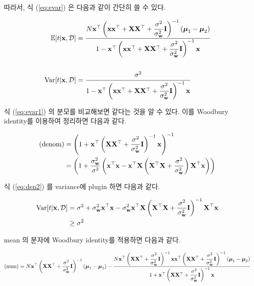 \documentclass{article} %
\begin{document}
따라서, 식 (\ref{eq:evar}) 은 다음과 같이 간단히 쓸 수 있다.

\begin{equation}
\begin{aligned}
	\mathbb{E}[t | {\bf x}, {\cal D}] &= \cfrac{N {\bf x}^\top \left( {\bf x}{\bf x}^\top + {\bf X}{\bf X}^\top + \dfrac{\sigma^2}{\sigma^2_{\bf w}} {\bf I}\right)^{-1}(\boldsymbol{\mu}_1 - \boldsymbol{\mu}_2)}{1 - {\bf x}^\top \left( {\bf x}{\bf x}^\top + {\bf X}{\bf X}^\top + \dfrac{\sigma^2}{\sigma^2_{\bf w}} {\bf I}  \right)^{-1} {\bf x}}
	\\\\
	{\rm Var}[t | {\bf x}, {\cal D}] &= \cfrac{\sigma^2}{1 - {\bf x}^\top \left( {\bf x}{\bf x}^\top + {\bf X}{\bf X}^\top + \dfrac{\sigma^2}{\sigma^2_{\bf w}} {\bf I}  \right)^{-1} {\bf x}}
\end{aligned}
\label{eq:evar1}
\end{equation}

식 (\ref{eq:evar1}) 의 분모를 비교해보면 같다는 것을 알 수 있다. 이를 Woodbury identity를 이용하여 정리하면 다음과 같다.


\begin{align}
	({\rm denom}) &= \left(
		1 + {\bf x}^\top \left( 
			{\bf X}{\bf X}^\top + \frac{\sigma^2}{\sigma^2_{\bf w}} {\bf I}
		\right) ^{-1} {\bf x}
	\right) ^{-1} \label{eq:den1} \\
	&= \left(
		1 + \frac{\sigma^2_{\bf w}}{\sigma^2} \left(
			{\bf x}^\top {\bf x} - {\bf x}^\top {\bf X} \left( 
				{\bf X}^\top{\bf X} + \frac{\sigma^2}{\sigma^2_{\bf w}}
			\right) {\bf X}^\top {\bf x}
		\right)
	\right) \label{eq:den2}
\end{align}


식 (\ref{eq:den2}) 를 variance에 plugin 하면 다음과 같다.

\begin{equation}
\begin{aligned}
	{\rm Var}[t | {\bf x}, {\cal D}] &= \sigma^2 + \sigma^2_{\bf w} {\bf x}^\top{\bf x} - \sigma^2_{\bf w} {\bf x}^\top {\bf X} \left( {\bf X}^\top{\bf X} + \frac{\sigma^2}{\sigma^2_{\bf w}} {\bf I} \right)^{-1} {\bf X}^\top {\bf x} \\
	&\ge \sigma^2
\end{aligned}
\end{equation}

mean 의 분자에 Woodbury identity를 적용하면 다음과 같다.

\begin{equation}
\begin{aligned}
	({\rm num}) = N{\bf x}^\top \left(
		{\bf X}{\bf X}^\top + \dfrac{\sigma^2}{\sigma^2_{\bf w}} {\bf I}
	\right)^{-1} (\boldsymbol{\mu}_1 - \boldsymbol{\mu}_2) -
	\cfrac{N{\bf x} ^\top \left({\bf X}{\bf X}^\top + \dfrac{\sigma^2}{\sigma^2_{\bf w}} {\bf I} \right)^{-1} {\bf x}{\bf x}^\top \left({\bf X}{\bf X}^\top + \dfrac{\sigma^2}{\sigma^2_{\bf w}} {\bf I} \right)^{-1} (\boldsymbol{\mu}_1 - \boldsymbol{\mu}_2)}{1 + {\bf x}^\top \left({\bf X}{\bf X}^\top + \dfrac{\sigma^2}{\sigma^2_{\bf w}} {\bf I} \right)^{-1}{\bf x}}
\end{aligned}
\end{equation}
\end{document}
